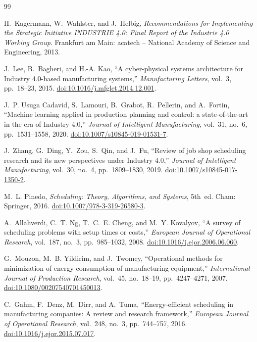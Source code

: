\documentclass[11pt,a4paper]{article}
\begin{document}
\newpage
\begin{thebibliography}{99}

 H.~Kagermann, W.~Wahlster, and J.~Helbig, \emph{Recommendations for Implementing the Strategic Initiative INDUSTRIE 4.0: Final Report of the Industrie 4.0 Working Group}. Frankfurt am Main: acatech -- National Academy of Science and Engineering, 2013.

 J.~Lee, B.~Bagheri, and H.-A. Kao, ``A cyber-physical systems architecture for Industry 4.0-based manufacturing systems,'' \emph{Manufacturing Letters}, vol.~3, pp.~18--23, 2015. \href{https://doi.org/10.1016/j.mfglet.2014.12.001}{doi:10.1016/j.mfglet.2014.12.001}.

 J.~P. Usuga Cadavid, S.~Lamouri, B.~Grabot, R.~Pellerin, and A.~Fortin, ``Machine learning applied in production planning and control: a state-of-the-art in the era of Industry 4.0,'' \emph{Journal of Intelligent Manufacturing}, vol.~31, no.~6, pp.~1531--1558, 2020. \href{https://doi.org/10.1007/s10845-019-01531-7}{doi:10.1007/s10845-019-01531-7}.

 J.~Zhang, G.~Ding, Y.~Zou, S.~Qin, and J.~Fu, ``Review of job shop scheduling research and its new perspectives under Industry 4.0,'' \emph{Journal of Intelligent Manufacturing}, vol.~30, no.~4, pp.~1809--1830, 2019. \href{https://doi.org/10.1007/s10845-017-1350-2}{doi:10.1007/s10845-017-1350-2}.

 M.~L. Pinedo, \emph{Scheduling: Theory, Algorithms, and Systems}, 5th~ed. Cham: Springer, 2016. \href{https://doi.org/10.1007/978-3-319-26580-3}{doi:10.1007/978-3-319-26580-3}.

 A.~Allahverdi, C.~T. Ng, T.~C.~E. Cheng, and M.~Y. Kovalyov, ``A survey of scheduling problems with setup times or costs,'' \emph{European Journal of Operational Research}, vol.~187, no.~3, pp.~985--1032, 2008. \href{https://doi.org/10.1016/j.ejor.2006.06.060}{doi:10.1016/j.ejor.2006.06.060}.

 G.~Mouzon, M.~B. Yildirim, and J.~Twomey, ``Operational methods for minimization of energy consumption of manufacturing equipment,'' \emph{International Journal of Production Research}, vol.~45, no.~18--19, pp.~4247--4271, 2007. \href{https://doi.org/10.1080/00207540701450013}{doi:10.1080/00207540701450013}.

 C.~Gahm, F.~Denz, M.~Dirr, and A.~Tuma, ``Energy-efficient scheduling in manufacturing companies: A review and research framework,'' \emph{European Journal of Operational Research}, vol.~248, no.~3, pp.~744--757, 2016. \href{https://doi.org/10.1016/j.ejor.2015.07.017}{doi:10.1016/j.ejor.2015.07.017}.


\end{thebibliography}
\end{document}
